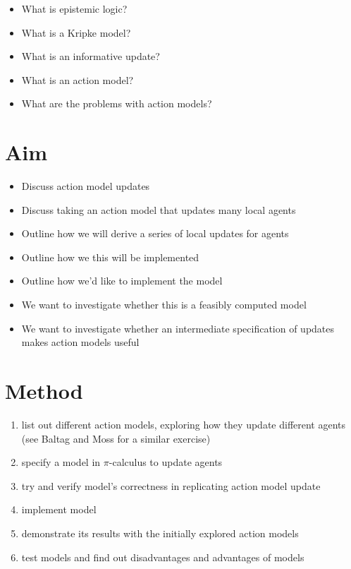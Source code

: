 \documentclass[12pt, a4paper]{article}
\begin{document}
\begin {itemize}
  \item What is epistemic logic?
  \item What is a Kripke model?
  \item What is an informative update?
  \item What is an action model?
  \item What are the problems with action models?
\end {itemize}

\section*{Aim}

\begin{itemize}
  \item Discuss action model updates
  \item Discuss taking an action model that updates many local agents
  \item Outline how we will derive a series of local updates for agents
  \item Outline how we this will be implemented
  \item Outline how we'd like to implement the model
  \item We want to investigate whether this is a feasibly computed model
  \item We want to investigate whether an intermediate specification of updates
    makes action models useful
\end{itemize}
 
\section*{Method}

\begin{enumerate}
  \item list out different action models, exploring how they update
    different agents (see Baltag and Moss for a similar exercise)
  \item specify a model in $\pi$-calculus to update agents
  \item try and verify model's correctness in replicating action model update
  \item implement model
  \item demonstrate its results with the initially explored action models
  \item test models and find out disadvantages and advantages of models
\end{enumerate}
\end{document}
